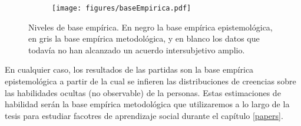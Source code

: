 \documentclass[a4paper,10pt]{book}
\theoremstyle{definition}
\begin{document}
\begin{figure}[ht!]
    \centering
    \begin{subfigure}[b]{0.48\textwidth}
    \texttt{[image: figures/baseEmpirica.pdf]}
    \end{subfigure}
    \caption{Niveles de base emp\'irica. En negro la base emp\'irica epistemol\'ogica, en gris la base emp\'irica metodol\'ogica, y en blanco los datos que todav\'ia no han alcanzado un acuerdo intersubjetivo amplio. }
\end{figure}
%
En cualquier caso, los resultados de las partidas son la base emp\'irica epistemol\'ogica a partir de la cual se infieren las distribuciones de creencias sobre las habilidades ocultas (no observable) de la personas.
%
Estas estimaciones de habilidad ser\'an la base emp\'irica metodol\'ogica que utilizaremos a lo largo de la tesis para estudiar facotres de aprendizaje social durante el cap\'itulo \ref{papers}.
\end{document}
